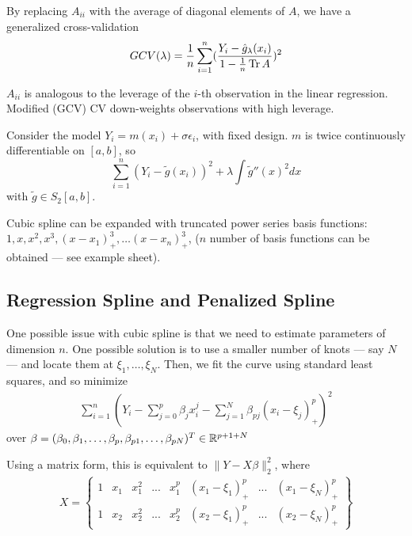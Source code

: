 By replacing $A_{ii}$ with the average of diagonal elements of $A$, we
have a generalized cross-validation
\begin{equation}
  \label{eq:81}
  GCV(\lambda) = \frac{1}{n} \sum_{i=1}^{n} (\frac{Y_{i} - \hat
    g_{\lambda}(x_{i})}{1 - \frac{1}{n} \operatorname*{Tr}{A}} )^{2}
\end{equation}

$A_{ii}$ is analogous to the leverage of the $i$-th observation in the
linear regression.  Modified (GCV) CV down-weights observations with
high leverage.

Consider the model $Y_{i} = m(x_{i}) + \sigma \epsilon_{i}$, with
fixed design.  $m$ is twice continuously differentiable on $[a, b]$, so
\begin{equation}
  \label{eq:82}
  \sum_{i=1}^{n} (Y_{i} - \tilde g(x_{i}))^{2} + \lambda \int \tilde
  g''(x)^{2} dx
\end{equation} with $\tilde g \in S_{2}[a, b]$.

Cubic spline can be expanded with truncated power series basis
functions: $1, x, x^{2}, x^{3}, (x - x_{1})^{3}_{+}, \dots (x -
x_{n})^{3}_{+}$, ($n$ number of basis functions can be obtained ---
see example sheet).

\subsection{Regression Spline and Penalized Spline}
\label{sec:regr-spline-penal}

One possible issue with cubic spline is that we need to estimate
parameters of dimension $n$.  One possible solution is to use a
smaller number of knots --- say $N$ --- and locate them at $\xi_{1},
\dots, \xi_{N}$. Then, we fit the curve using standard least squares,
and so minimize
\begin{align}
  \label{eq:83}
  \sum_{i=1}^{n} (Y_{i} - \sum_{j=0}^{p} \beta_{j} x_{i}^{j} -
  \sum_{j=1}^{N} \beta_{pj} (x_{i} - \xi_{j})_{+}^{p})^{2}
\end{align} over $\beta = (\beta_{0}, \beta_{1}, \dots, \beta_{p},
\beta_{p1}, \dots, \beta_{pN})^{T} \in \mathbb{R}^{p + 1 + N}$

Using a matrix form, this is equivalent to $\| Y - X \beta
\|_{2}^{2}$, where
\begin{align}
  \label{eq:84}
  X =
  \begin{Bmatrix}
    1 & x_{1} & x_{1}^{2} & ... & x_{1}^{p} & (x_{1} -
    \xi_{1})_{+}^{p} & ... & (x_{1} - \xi_{N})_{+}^{p} \\
    1 & x_{2} & x_{2}^{2} & ... & x_{2}^{p} & (x_{2} -
    \xi_{1})_{+}^{p} & ... & (x_{2} - \xi_{N})_{+}^{p} 
  \end{Bmatrix}
\end{align}

